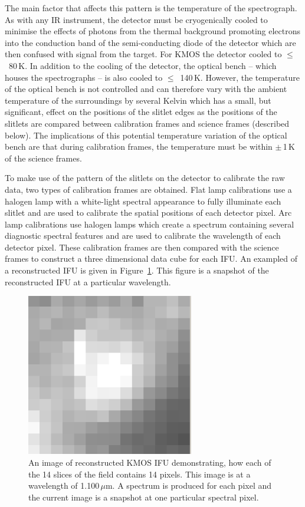 The main factor that affects this pattern is the temperature of the spectrograph.
As with any IR instrument, the detector must be cryogenically cooled to minimise the effects of photons from the thermal background promoting electrons into the conduction band of the semi-conducting diode of the detector which are then confused with signal from the target.
For KMOS the detector cooled to $\le$~80\,K.
In addition to the cooling of the detector, the optical bench -- which houses the spectrographs -- is also cooled to $\le$~140\,K.
However, the temperature of the optical bench is not controlled and can therefore vary with the ambient temperature of the surroundings by several Kelvin which has a small, but significant, effect on the positions of the slitlet edges as the positions of the slitlets are compared between calibration frames and science frames (described below).
The implications of this potential temperature variation of the optical bench are that during calibration frames, the temperature must be within $\pm$\,1\,K of the science frames.

To make use of the pattern of the slitlets on the detector to calibrate the raw data, two types of calibration frames are obtained.
Flat lamp calibrations use a halogen lamp with a white-light spectral appearance to fully illuminate each slitlet and are used to calibrate the spatial positions of each detector pixel.
Arc lamp calibrations use halogen lamps which create a spectrum containing several diagnostic spectral features and are used to calibrate the wavelength of each detector pixel.
These calibration frames are then compared with the science frames to construct a three dimensional data cube for each IFU.
An exampled of a reconstructed IFU is given in Figure~\ref{fig:kmosIFU}.
This figure is a snapshot of the reconstructed IFU at a particular wavelength.

\begin{figure}
 \centering
 \includegraphics[width=0.65\textwidth]{kmos/kmos-ifu}
 \caption[Example of a KMOS IFU]{An image of reconstructed KMOS IFU demonstrating, how each of the 14 slices of the field contains 14 pixels.
 This image is at a wavelength of 1.100\,$\mu$m.
 A spectrum is produced for each pixel and the current image is a snapshot at one particular spectral pixel.
 \label{fig:kmosIFU}}
\end{figure}

